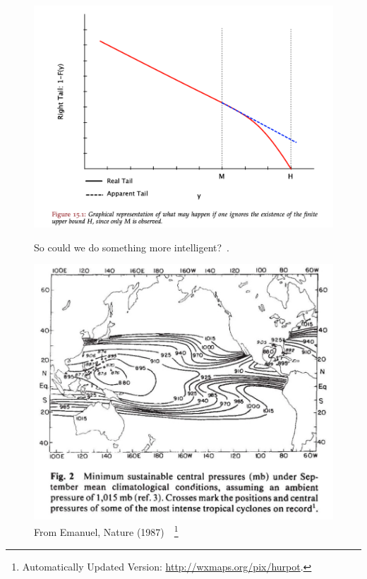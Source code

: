 \begin{figure}[htb!]
    \centering
    \includegraphics[width=1\linewidth]{images/nnt-upper-bound.png}
    \vspace{-15pt}
   \caption{So could we do something more intelligent?~\cite{taleb2019statistical}. }
   \label{fig:up-bound-taleb}
   \includegraphics[width=1\linewidth]{images/hurricane-Emanuel-upper-bound.png}
   \vspace{-15pt}
  \caption{From Emanuel, Nature (1987)~\cite{emanuel1987dependence}~\footnote{Automatically Updated Version: \url{http://wxmaps.org/pix/hurpot}.} }
   \label{fig:emanuel87}

\end{figure}

